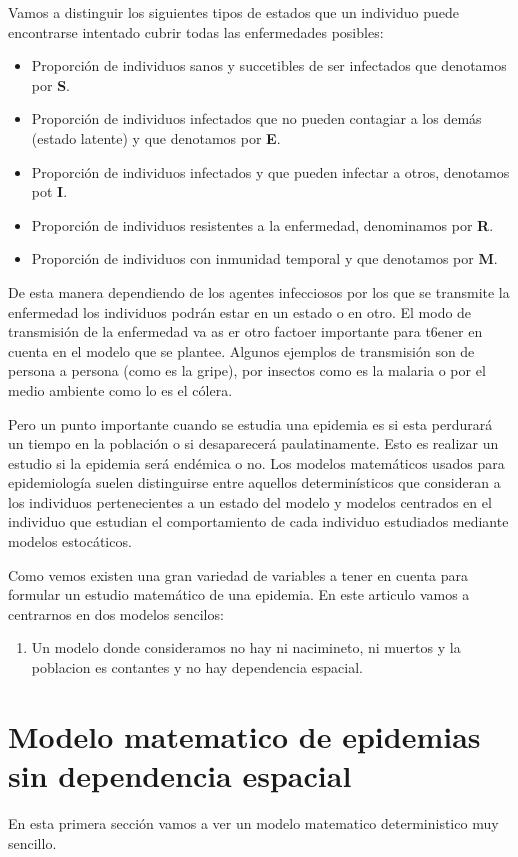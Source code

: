 Vamos a distinguir los siguientes tipos de estados que un individuo puede encontrarse intentado cubrir todas las enfermedades posibles:
\begin{itemize}
\item Proporción de individuos sanos y succetibles de ser infectados que denotamos por \textbf{S}.
\item Proporción de individuos infectados que no pueden contagiar a los demás (estado latente) y que denotamos por \textbf{E}.
\item Proporción de individuos infectados y que pueden infectar a otros, denotamos pot \textbf{I}.
\item Proporción de individuos resistentes a la enfermedad, denominamos por \textbf{R}.
\item Proporción de individuos con inmunidad temporal y que denotamos por \textbf{M}.
\end{itemize}

De esta manera dependiendo de los agentes infecciosos por los que se transmite la enfermedad los individuos podrán estar en un estado o en otro. El modo de transmisión de la enfermedad va as er otro factoer importante para t6ener en cuenta en el modelo que se plantee. Algunos ejemplos de transmisión son de persona a persona (como es la gripe), por insectos como es la malaria o por el medio ambiente como lo es el cólera.

Pero un punto importante cuando se estudia una epidemia es si esta perdurará un tiempo en la población o si desaparecerá paulatinamente. Esto es realizar un estudio si la epidemia será endémica o no.
Los modelos matemáticos usados para epidemiología suelen distinguirse entre aquellos determinísticos que consideran a los individuos pertenecientes a un estado del modelo y modelos centrados en el individuo que estudian el comportamiento de cada individuo estudiados mediante modelos estocáticos.

Como vemos existen una gran variedad de variables a tener en cuenta para formular un estudio matemático de una epidemia. En este articulo vamos a centrarnos en dos modelos sencilos:
\begin{enumerate}
\item Un modelo donde consideramos no hay ni nacimineto, ni muertos y la poblacion es contantes y no hay dependencia espacial. 
\end{enumerate}

\section{Modelo matematico de epidemias sin dependencia espacial}
En esta primera sección vamos a ver un modelo matematico deterministico muy sencillo. 
